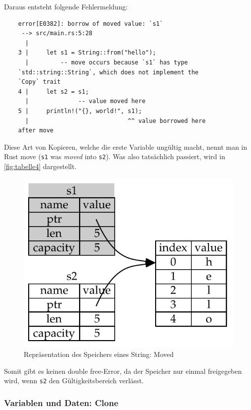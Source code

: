 Daraus entsteht folgende Fehlermeldung:


\begin{lstlisting}
    error[E0382]: borrow of moved value: `s1`
     --> src/main.rs:5:28
      |
    3 |     let s1 = String::from("hello");
      |         -- move occurs because `s1` has type
    `std::string::String`, which does not implement the
    `Copy` trait
    4 |     let s2 = s1;
      |              -- value moved here
    5 |     println!("{}, world!", s1);
      |                            ^^ value borrowed here
    after move
\end{lstlisting}

Diese Art von Kopieren, welche die erste Variable ungültig macht, nennt man in Rust \glqq move\grqq{} (\verb"s1" was \textit{moved} into \verb"s2"). Was also tatsächlich passiert, wird in \autoref{fig:tabelle4} dargestellt.

\begin{figure}[htbp]
    \centering
    \includegraphics[scale=0.9]{Programmierung/Tabelle4.pdf}
    \caption{Repräsentation des Speichers eines String: Moved}
    \label{fig:tabelle4}
\end{figure}

Somit gibt es keinen \glqq double free\grqq{}-Error, da der Speicher nur einmal freigegeben wird, wenn \verb"s2" den Gültigkeitsbereich verlässt.

\subsubsection{Variablen und Daten: Clone}

